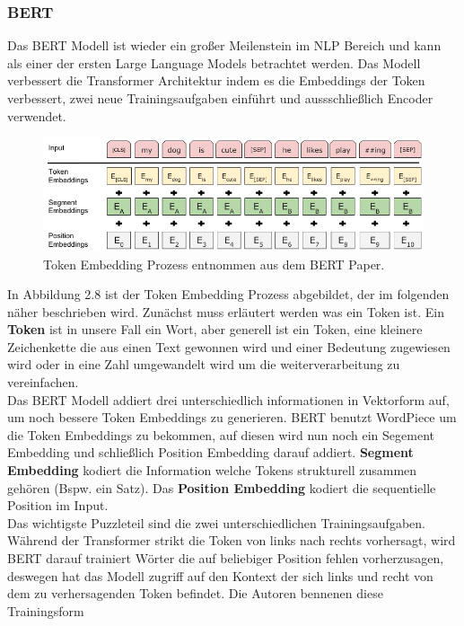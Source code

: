 \documentclass[12pt,letterpaper,ngerman]{article}
\begin{document}
\subsubsection{BERT}
Das BERT Modell ist wieder ein großer Meilenstein im NLP Bereich und
kann als einer der ersten Large Language Models betrachtet werden.
Das Modell verbessert die Transformer Architektur indem es die
Embeddings der Token verbessert, zwei neue Trainingsaufgaben einführt
und aussschließlich Encoder verwendet.
\begin{figure}[H]
  \begin{center}
    \includegraphics[scale=0.5]{BERT-Tokens.png}
  \end{center}
  \caption{Token Embedding Prozess entnommen aus dem BERT Paper.}
\end{figure}
In Abbildung 2.8 ist der Token Embedding Prozess abgebildet, der
im folgenden näher beschrieben wird. Zunächst muss erläutert 
werden was ein  Token ist. Ein {\bf Token} ist in unsere Fall ein Wort,
aber generell ist ein Token, eine kleinere Zeichenkette die aus
einen Text gewonnen wird und einer Bedeutung zugewiesen wird
oder in eine Zahl umgewandelt wird um die weiterverarbeitung
zu vereinfachen.\\
Das BERT Modell addiert drei unterschiedlich informationen
in Vektorform auf, um noch bessere Token Embeddings zu
generieren. BERT benutzt WordPiece %
um die Token Embeddings zu bekommen, auf diesen wird
nun noch ein Segement Embedding und schließlich Position
Embedding darauf addiert. {\bf Segment Embedding} kodiert
die Information welche Tokens strukturell zusammen gehören
(Bspw. ein Satz). Das {\bf Position Embedding} kodiert
die sequentielle Position im Input.\\
Das wichtigste Puzzleteil sind die zwei unterschiedlichen
Trainingsaufgaben. Während der Transformer strikt die
Token von links nach rechts vorhersagt, wird BERT darauf
trainiert Wörter die auf beliebiger Position fehlen 
vorherzusagen, deswegen hat das Modell zugriff auf
den Kontext der sich links und recht von dem zu verhersagenden
Token befindet. Die Autoren bennenen diese Trainingsform
\end{document}
